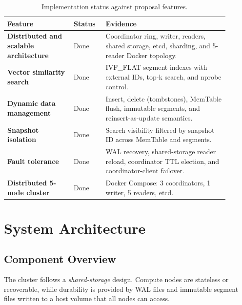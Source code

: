 \documentclass[11pt,a4paper]{article}
\begin{document}
\begin{table}[H]
\centering
\caption{Implementation status against proposal features.}
\renewcommand{\arraystretch}{1.2}
\begin{tabular}{>{\bfseries}p{0.27\linewidth} p{0.13\linewidth} p{0.50\linewidth}}
\toprule
Feature & Status & Evidence \\
\midrule
Distributed and scalable architecture & \textcolor{vsgreen}{Done} &
  Coordinator ring, writer, readers, shared storage, etcd, sharding, and
  5-reader Docker topology. \\
Vector similarity search & \textcolor{vsgreen}{Done} &
  IVF\_FLAT segment indexes with external IDs, top-k search, and nprobe
  control. \\
Dynamic data management & \textcolor{vsgreen}{Done} &
  Insert, delete (tombstones), MemTable flush, immutable segments, and
  reinsert-as-update semantics. \\
Snapshot isolation & \textcolor{vsgreen}{Done} &
  Search visibility filtered by snapshot ID across MemTable and segments. \\
Fault tolerance & \textcolor{vsgreen}{Done} &
  WAL recovery, shared-storage reader reload, coordinator TTL election, and
  coordinator-client failover. \\
Distributed 5-node cluster & \textcolor{vsgreen}{Done} &
  Docker Compose: 3 coordinators, 1 writer, 5 readers, etcd. \\
\bottomrule
\end{tabular}
\end{table}

\section{System Architecture}

\subsection{Component Overview}

The cluster follows a \emph{shared-storage} design. Compute nodes are
stateless or recoverable, while durability is provided by WAL files and
immutable segment files written to a host volume that all nodes can access.
\end{document}
